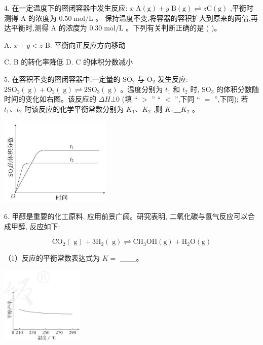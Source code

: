\documentclass[10pt]{article}
\begin{document}
4. 在一定温度下的密闭容器中发生反应: \(x\mathrm{\;A}\left( \mathrm{g}\right) + y\mathrm{\;B}\left( \mathrm{g}\right) \rightleftharpoons z\mathrm{C}\left( \mathrm{g}\right)\) ,平衡时测得 \(\mathrm{A}\) 的浓度为 \({0.50}\mathrm{\;{mol}}/\mathrm{L}\) 。 保持温度不变,将容器的容积扩大到原来的两倍,再达平衡时,测得 \(\mathrm{A}\) 的浓度为 \({0.30}\mathrm{\;{mol}}/\mathrm{L}\) 。下列有关判断正确的是 ( )。

A. \(x + y < z\) B. 平衡向正反应方向移动

C. B 的转化率降低 D. C 的体积分数减小

5. 在容积不变的密闭容器中,一定量的 \({\mathrm{{SO}}}_{2}\) 与 \({\mathrm{O}}_{2}\) 发生反应: \(2{\mathrm{{SO}}}_{2}\left( \mathrm{\;g}\right) + {\mathrm{O}}_{2}\left( \mathrm{\;g}\right) \rightleftharpoons 2{\mathrm{{SO}}}_{3}\left( \mathrm{\;g}\right)\) 。温度分别为 \({t}_{1}\) 和 \({t}_{2}\) 时, \({\mathrm{{SO}}}_{3}\) 的体积分数随时间的变化如右图。该反应的 \({\Delta H} \bot 0\) (填 “ \(>\) ” “ \(<\) ”,下同 “ \(=\) ”,下同); 若 \({t}_{1}\text{、}{t}_{2}\) 时该反应的化学平衡常数分别为 \({K}_{1}\text{、}{K}_{2}\) ,则 \({K}_{1}\_ \_ \_ {K}_{2}\) 。

\begin{center}
\includegraphics[max width=0.4\textwidth]{images/0190da9d-8bfd-732f-bc2c-0b21d0f13b91_47_167176.jpg}
\end{center}

6. 甲醇是重要的化工原料, 应用前景广阔。研究表明, 二氧化碳与氢气反应可以合成甲醇, 反应如下:

\[
{\mathrm{{CO}}}_{2}\left( \mathrm{\;g}\right) + 3{\mathrm{H}}_{2}\left( \mathrm{\;g}\right) \rightleftharpoons {\mathrm{{CH}}}_{3}\mathrm{{OH}}\left( \mathrm{g}\right) + {\mathrm{H}}_{2}\mathrm{O}\left( \mathrm{g}\right)
\]

（1）反应的平衡常数表达式为 \(K =\) \_\_\_。

\begin{center}
\includegraphics[max width=0.3\textwidth]{images/0190da9d-8bfd-732f-bc2c-0b21d0f13b91_47_729946.jpg}
\end{center}
\end{document}
